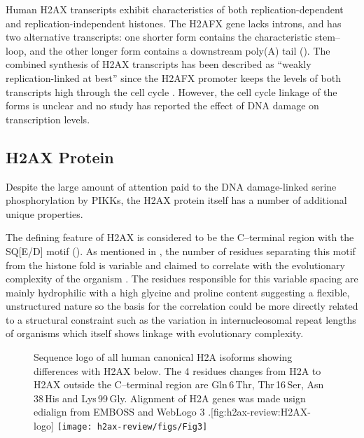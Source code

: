 Human H2AX transcripts exhibit characteristics of both replication-dependent and replication-independent
histones. The H2AFX gene lacks introns, and has two alternative transcripts: one shorter form contains
the characteristic stem--loop, and the other longer form contains a downstream poly(A) tail \citep{CMWMB89}
(). The combined synthesis of H2AX transcripts has been described as ``weakly
replication-linked at best'' since the H2AFX promoter keeps the levels of both transcripts high
through the cell cycle \citep{VSI94}. However, the cell cycle linkage of the forms is unclear and no
study has reported the effect of DNA damage on transcription levels.

\subsection{H2AX Protein}
\label{subsec:h2ax-review:H2AX-protein}
Despite the large amount of attention paid to the DNA damage-linked serine phosphorylation by PIKKs,
the H2AX protein itself has a number of additional unique properties.

The defining feature of H2AX is considered to be the C--terminal region with the SQ[E/D]\textPhi{} motif
(). As mentioned in , the number of
residues separating this motif from the histone fold is variable and claimed to correlate with the
evolutionary complexity of the organism \citep{CRDP+02}. The residues responsible for this variable
spacing are mainly hydrophilic with a high glycine and proline content suggesting a flexible,
unstructured nature so the basis for the correlation could be more directly related to a structural
constraint such as the variation in internucleosomal repeat lengths of organisms which itself shows
linkage with evolutionary complexity.

\begin{figure}
\begin{sidecaption}{Sequence logo of all human canonical H2A isoforms showing differences with H2AX below. The
4 residues changes from H2A to H2AX outside the C--terminal region are Gln\,6\,Thr, Thr\,16\,Ser, Asn\,38\,His
and Lys\,99\,Gly. Alignment of H2A genes was made usign edialign \protect\citep{Mor99} from EMBOSS
\protect\citep{RLB00} and WebLogo 3 \protect\citep{CHC+04}.}[fig:h2ax-review:H2AX-logo]
\centering
\texttt{[image: h2ax-review/figs/Fig3]}
\end{sidecaption}
\end{figure}

